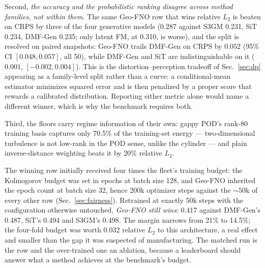 \documentclass[aip,pof,reprint,amsmath,amssymb,superscriptaddress]{revtex4-1}
\newcommand{\dmfgen}{DMF-Gen}
\begin{document}
Second, \emph{the accuracy and the probabilistic ranking disagree across
method families, not within them}. The same Geo-FNO row that wins relative
$L_2$ is beaten on CRPS by three of the four generative models (0.287 against S3GM
0.231, SiT 0.234, \dmfgen{} 0.235; only latent FM, at 0.310, is worse), and the
split is resolved on paired snapshots: Geo-FNO trails \dmfgen{} on CRPS by 0.052
(95\% CI $[0.048, 0.057]$, all 50), while \dmfgen{} and SiT are indistinguishable
on it ($0.001$, $[-0.002, 0.004]$). This is the distortion--perception tradeoff of
Sec.~\ref{sec:dp} appearing as a family-level split rather than a curve: a
conditional-mean estimator minimizes squared error and is then penalized by a
proper score that rewards a calibrated distribution. Reporting either metric
alone would name a different winner, which is why the benchmark requires both.

Third, the floors carry regime information of their own: gappy POD's rank-80
training basis captures only 70.5\% of the training-set energy ---
two-dimensional turbulence is not low-rank in the POD sense, unlike the
cylinder --- and plain inverse-distance weighting beats it by 20\% relative
$L_2$.

The winning row initially received four times the fleet's training budget:
the Kolmogorov budget was set in epochs at batch size 128, and Geo-FNO
inherited the epoch count at batch size 32, hence 200k optimizer steps against
the ${\sim}50$k of every other row (Sec.~\ref{sec:fairness}). Retrained at
exactly 50k steps with the configuration otherwise untouched, \emph{Geo-FNO
still wins}: 0.417 against \dmfgen{}'s 0.487, SiT's 0.494 and S3GM's 0.498.
The margin narrows from 21\% to 14.5\%; the four-fold budget was worth 0.032
relative $L_2$ to this architecture, a real effect and smaller than the gap it
was suspected of manufacturing. The matched run is the row and the
over-trained one an ablation, because a leaderboard should answer what a
method achieves at the benchmark's budget.
\end{document}
